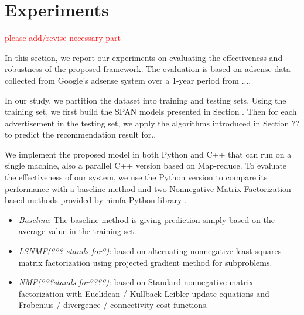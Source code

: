 \section{Experiments}
\label{sec:exp}

\textcolor{red}{ please add/revise necessary part}

In this section, we report our experiments on evaluating the
effectiveness and robustness of the proposed framework.  The
evaluation is based on adsense data collected from Google's adsense
system over a 1-year period from ....

In our study, we partition the dataset into training and testing
sets. Using the training set, we first build the SPAN models presented
in Section \cite{model}.  Then for each advertisement in the testing
set, we apply the algorithms introduced in Section ?? to predict the
recommendation result for..

We implement the proposed {\sppan} model in both Python and C++ that
can run on a single machine, also a parallel C++ version based on
Map-reduce.  To evaluate the effectiveness of our system, we use the
Python version to compare its performance with a baseline method and
two Nonnegative Matrix Factorization based methods provided by nimfa
Python library \cite{ZitnikZ12}.

\begin{itemize} \itemsep -2pt
\item {\em Baseline}: The baseline method is giving prediction simply
  based on the average value in the training set.
\item {\em LSNMF(??? stands for?)}: based on alternating nonnegative least
  squares matrix factorization using projected gradient method for
  subproblems\cite{lin2007projected}.
\item {\em NMF(???stands for????)}: based on Standard nonnegative matrix
  factorization with Euclidean / Kullback-Leibler update equations and
  Frobenius / divergence / connectivity cost
  functions\cite{lee2001algorithms, brunet2004metagenes}.
\end{itemize}


